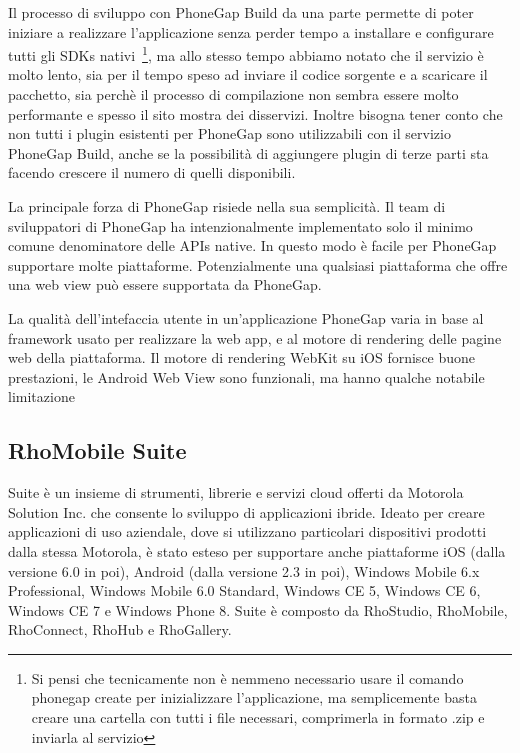             Il processo di sviluppo con PhoneGap Build da una parte permette di
            poter iniziare a realizzare l'applicazione senza perder tempo a
            installare e configurare tutti gli SDKs nativi~\footnote{Si pensi
            che tecnicamente non è nemmeno necessario usare il comando
            phonegap create per inizializzare l'applicazione, ma semplicemente
            basta creare una cartella con tutti i file necessari, comprimerla
            in formato .zip e inviarla al servizio}, ma allo stesso tempo
            abbiamo notato che il servizio è molto lento, sia per il tempo speso
            ad inviare il codice sorgente e a scaricare il pacchetto, sia perchè
            il processo di compilazione non sembra essere molto performante e
            spesso il sito mostra
            dei disservizi. Inoltre bisogna tener conto che non tutti i plugin
            esistenti per PhoneGap sono utilizzabili con il servizio
            PhoneGap Build, anche se la possibilità di aggiungere plugin di terze
            parti sta facendo crescere il numero di quelli disponibili.

            La principale forza di PhoneGap risiede nella sua semplicità.
            Il team di sviluppatori di PhoneGap ha intenzionalmente implementato
            solo il minimo comune denominatore delle APIs native. In questo modo
            è facile per PhoneGap supportare molte piattaforme. Potenzialmente
            una qualsiasi piattaforma che offre una web view può essere supportata
            da PhoneGap.

            La qualità dell'intefaccia utente in un'applicazione PhoneGap
            varia in base al frame\-work usato per realizzare la web app, e al
            motore di rendering delle pagine web della piattaforma.
            Il motore di rendering WebKit su iOS fornisce buone prestazioni, le
            Android Web View sono funzionali, ma hanno qualche notabile
            limitazione~\citep{Web:KevinSite}


        \subsection{RhoMobile Suite}
            \rhom{} Suite è un insieme di strumenti, librerie e servizi cloud
            offerti da Motorola Solution Inc. che consente lo sviluppo di
            applicazioni ibride. Ideato per creare applicazioni di uso aziendale,
            dove si utilizzano particolari dispositivi prodotti dalla stessa
            Motorola, è stato esteso per supportare anche piattaforme iOS
            (dalla versione 6.0 in poi), Android (dalla versione 2.3 in poi),
            Windows Mobile 6.x Professional, Windows Mobile 6.0 Standard,
            Windows CE 5, Windows CE 6, Windows CE 7 e Windows Phone 8.
            \rhom{} Suite è composto da RhoStudio, RhoMobile, RhoConnect,
            RhoHub e RhoGallery.
